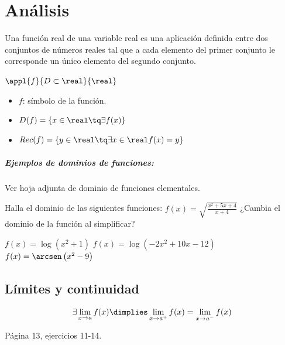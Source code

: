 
\chapter{Análisis}

\begin{defn}
Una función real de una variable real es una aplicación definida entre dos conjuntos de números reales tal que a cada elemento del primer conjunto le corresponde un único elemento del segundo conjunto.

$\appl{f}{D\subset\real}{\real}$

\begin{itemize}
	\item $f$: símbolo de la función.
	\item $D(f) = \{x\in\real \tq \exists f(x)\}$
	\item $Rec(f) = \{y\in\real \tq \exists x \in\real f(x)=y\}$
\end{itemize}
\end{defn}

\paragraph{Ejemplos de dominios de funciones:} Ver hoja adjunta de dominio de funciones elementales.

\begin{problem}
Halla el dominio de las siguientes funciones:
\ppart $f(x) = \sqrt{\displaystyle\frac{x^2+5x+4}{x+4}}$ \obs ¿Cambia el dominio de la función al simplificar?

\ppart  $f(x) = \log\left(x^2+1\right)$
\ppart  $f(x) = \log\left(-2x^2+10x-12\right)$
\ppart $f(x) = \arcsen\left(x^2-9\right)$

\solution

\end{problem}

\section{Límites y continuidad}

\begin{theorem}
\[\exists \lim_{x\to a}f(x) \dimplies \lim_{x\to a^+} f(x) = \lim_{x\to a^-}f(x)\]
\end{theorem}

\begin{problem}
Página 13, ejercicios 11-14. 
\solution
\end{problem}

